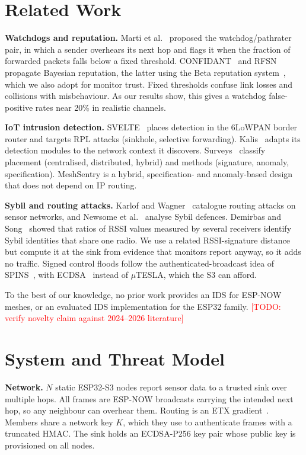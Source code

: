 \documentclass[conference]{IEEEtran}
\newcommand{\todo}[1]{\textcolor{red}{[TODO: #1]}}
\begin{document}
\section{Related Work}
\textbf{Watchdogs and reputation.} Marti et al.~\cite{marti2000watchdog}
proposed the watchdog/pathrater pair, in which a sender overhears its next hop and
flags it when the fraction of forwarded packets falls below a fixed threshold.
CONFIDANT~\cite{buchegger2002confidant} and RFSN~\cite{ganeriwal2008rfsn}
propagate Bayesian reputation, the latter using the Beta reputation
system~\cite{josang2002beta}, which we also adopt for monitor trust. Fixed
thresholds confuse link losses and collisions with misbehaviour. As our results show, this
gives a watchdog false-positive rates near 20\% in realistic channels.

\textbf{IoT intrusion detection.} SVELTE~\cite{raza2013svelte} places
detection in the 6LoWPAN border router and targets RPL attacks (sinkhole,
selective forwarding). Kalis~\cite{midi2017kalis} adapts its detection modules
to the network context it discovers. Surveys~\cite{butun2014survey,zarpelao2017survey}
classify placement (centralised, distributed, hybrid) and methods
(signature, anomaly, specification). MeshSentry is a hybrid,
specification- and anomaly-based design that does not depend on IP routing.

\textbf{Sybil and routing attacks.} Karlof and Wagner~\cite{karlof2003secure}
catalogue routing attacks on sensor networks, and Newsome et al.~\cite{newsome2004sybil}
analyse Sybil defences. Demirbas and Song~\cite{demirbas2006sybil} showed that
ratios of RSSI values measured by several receivers identify Sybil identities that share one radio.
We use a related RSSI-signature distance but compute it at the sink
from evidence that monitors report anyway, so it adds no traffic. Signed
control floods follow the authenticated-broadcast idea of
SPINS~\cite{perrig2002spins}, with ECDSA~\cite{fips186-5} instead of $\mu$TESLA,
which the S3 can afford.

To the best of our knowledge, no prior work provides an IDS for ESP-NOW
meshes, or an evaluated IDS implementation for the ESP32 family.
\todo{verify novelty claim against 2024--2026 literature}

\section{System and Threat Model}
\label{sec:model}
\textbf{Network.} $N$ static ESP32-S3 nodes report sensor data to a
trusted sink over multiple hops. All frames are ESP-NOW broadcasts carrying the
intended next hop, so any neighbour can overhear them. Routing is an ETX
gradient~\cite{decouto2003etx}. Members share a network key $K$, which they
use to authenticate frames with a truncated HMAC. The sink holds an
ECDSA-P256 key pair whose public key is provisioned on all nodes.
\end{document}
